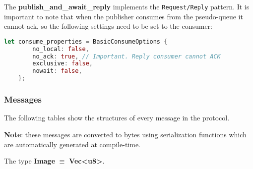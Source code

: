 \documentclass[../documentation.tex]{subfiles}
\begin{document}
The \textbf{publish\_and\_await\_reply}
implements the \texttt{Request/Reply} pattern.
It is important to note that when the publisher consumes
from the pseudo-queue it cannot ack, so the following
settings need to be set to the consumer:

\begin{lstlisting}[language=Rust, style=boxed, numbers=none]
    let consume_properties = BasicConsumeOptions {
        no_local: false,
        no_ack: true, // Important. Reply consumer cannot ACK
        exclusive: false,
        nowait: false,
    };
\end{lstlisting}

\pagebreak

\subsubsection{Messages}

The following tables show the structures of every message
in the protocol.

\textbf{\color{red} Note}: these messages are converted to bytes
using serialization functions which are automatically generated at compile-time.

The type \textbf{Image} \(\equiv\) \textbf{Vec<u8>}.

\newcommand{\tline}{
    \\ \hline
}

\newcommand{\packetstruct}[1]{
    \bgroup{}
    \def\arraystretch{1.25}
        \begin{tabular}{|l|l|l|}
            \hline
            \textbf{Field} & \textbf{Type} & \textbf{Description}
            \tline
            
            \if\relax\detokenize{#1}\relax
            \else
                #1
                \tline
            \fi
        \end{tabular}
    \egroup{}
}

\newcommand{\packetenum}[1]{
    \bgroup{}
    \def\arraystretch{1.25}
        \begin{tabular}{|l|l|l|}
            \hline
            \textbf{Field} & \textbf{Content} & \textbf{Description}
            \tline
            
            \if\relax\detokenize{#1}\relax
            \else
                #1
                \tline
            \fi
        \end{tabular}
    \egroup{}
}
\end{document}
